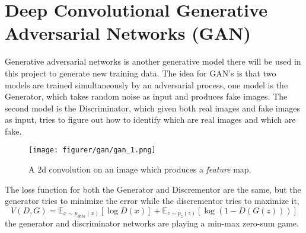 \documentclass[11pt]{article}
\begin{document}
\section{Deep Convolutional Generative Adversarial Networks (GAN)}

Generative adversarial networks is another generative model there will be used in this project to generate new training data. The idea for GAN's is that two models are trained simultaneously by an adversarial process, one model is the Generator, which takes random noise as input and produces fake images. The second model is the Discriminator, which given both real images and fake images as input, tries to figure out how to identify which are real images and which are fake.
\begin{figure}[!h]\label{conv2}
    \centering
    \texttt{[image: figurer/gan/gan\_1.png]}
    \caption{A 2d convolution on an image which produces a \textit{feature} map.}
    \label{fig:conv}
\end{figure}
The loss function for both the Generator and Discrementor are the same, but the generator tries to minimize the error while the discrementor tries to maximize it,
\begin{equation}
    V(D, G) = \mathds{E}_{x \sim p_{data}(x)} [\log D(x)] + \mathds{E}_{z \sim p_{z} (z)} [\log (1 - D(G(z)))]
\end{equation}
the generator and discriminator networks are playing a min-max zero-sum game. 
\end{document}
